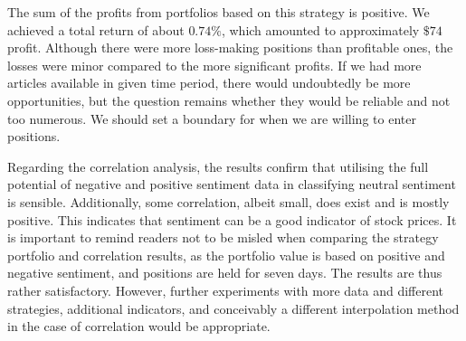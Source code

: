 The sum of the profits from portfolios based on this strategy is positive. We achieved a total return of about $0.74\%$, which amounted to approximately $\$74$ profit. Although there were more loss-making positions than profitable ones, the losses were minor compared to the more significant profits. If we had more articles available in given time period, there would undoubtedly be more opportunities, but the question remains whether they would be reliable and not too numerous. We should set a boundary for when we are willing to enter positions.

Regarding the correlation analysis, the results confirm that utilising the full potential of negative and positive sentiment data in classifying neutral sentiment is sensible. Additionally, some correlation, albeit small, does exist and is mostly positive. This indicates that sentiment can be a good indicator of stock prices. It is important to remind readers not to be misled when comparing the strategy portfolio and correlation results, as the portfolio value is based on positive and negative sentiment, and positions are held for seven days. The results are thus rather satisfactory. However, further experiments with more data and different strategies, additional indicators, and conceivably a different interpolation method in the case of correlation would be appropriate.

